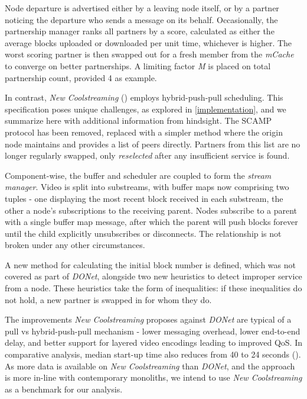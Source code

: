 \documentclass[12pt,a4paper]{article}
\begin{document}
Node departure is advertised either by a leaving node itself, or by a partner noticing the departure who sends a message on its behalf. Occasionally, the partnership manager ranks all partners by a score, calculated as either the average blocks uploaded or downloaded per unit time, whichever is higher. The worst scoring partner is then swapped out for a fresh member from the \textit{mCache} to converge on better partnerships. A limiting factor \textit{M} is placed on total partnership count, provided 4 as example.

In contrast, \textit{New Coolstreaming} (\cite{Li2008}) employs hybrid-push-pull scheduling. This specification poses unique challenges, as explored in \ref{implementation}, and we summarize here with additional information from hindsight. The SCAMP protocol has been removed, replaced with a simpler method where the origin node maintains and provides a list of peers directly. Partners from this list are no longer regularly swapped, only \textit{reselected} after any insufficient service is found.

Component-wise, the buffer and scheduler are coupled to form the \textit{stream manager}. Video is split into substreams, with buffer maps now comprising two tuples - one displaying the most recent block received in each substream, the other a node's subscriptions to the receiving parent. Nodes subscribe to a parent with a single buffer map message, after which the parent will push blocks forever until the child explicitly unsubscribes or disconnects. The relationship is not broken under any other circumstances.

A new method for calculating the initial block number is defined, which was not covered as part of \textit{DONet}, alongside two new heuristics to detect improper service from a node. These heuristics take the form of inequalities: if these inequalities do not hold, a new partner is swapped in for whom they do.

The improvements \textit{New Coolstreaming} proposes against \textit{DONet} are typical of a pull vs hybrid-push-pull mechanism - lower messaging overhead, lower end-to-end delay, and better support for layered video encodings leading to improved QoS. In comparative analysis, median start-up time also reduces from 40 to 24 seconds (\cite{Li2007}). As more data is available on \textit{New Coolstreaming} than \textit{DONet}, and the approach is more in-line with contemporary monoliths, we intend to use \textit{New Coolstreaming} as a benchmark for our analysis.
\end{document}
